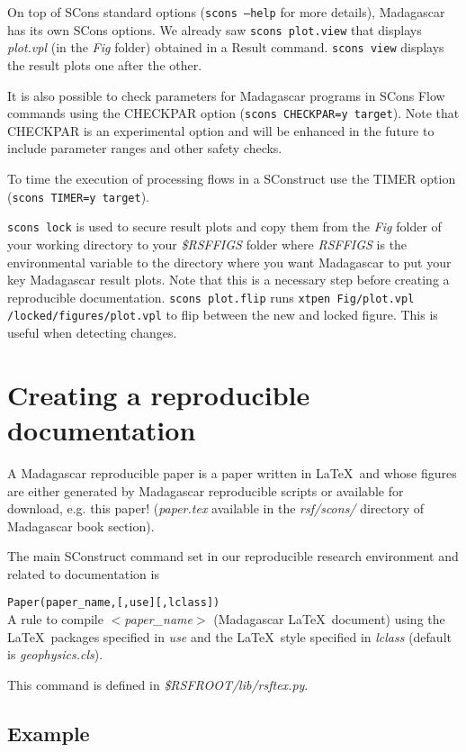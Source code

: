 On top of SCons standard options (\texttt{scons --help} for more
details), Madagascar has its own SCons options. We already saw
\texttt{scons plot.view} that displays \textit{plot.vpl} (in the
\textit{Fig} folder) obtained in a Result command. \texttt{scons view}
displays the result plots one after the other.

It is also possible to check parameters for Madagascar programs in
SCons Flow commands using the CHECKPAR option (\texttt{scons
  CHECKPAR=y target}). Note that CHECKPAR is an experimental option
and will be enhanced in the future to include parameter ranges and
other safety checks.

To time the execution of processing flows in a SConstruct use the
TIMER option (\texttt{scons TIMER=y target}).

\texttt{scons lock} is used to secure result plots and copy them from
the \textit{Fig} folder of your working directory to your
\textit{\$RSFFIGS} folder where \textit{RSFFIGS} is the environmental
variable to the directory where you want Madagascar to put your key
Madagascar result plots. Note that this is a necessary step before
creating a reproducible documentation. \texttt{scons plot.flip} runs
\texttt{xtpen Fig/plot.vpl /locked/figures/plot.vpl} to flip between
the new and locked figure. This is useful when detecting changes.

\section{Creating a reproducible documentation}
%
A Madagascar reproducible paper is a paper written in \LaTeX\ and
whose figures are either generated by Madagascar reproducible scripts
or available for download, e.g.  this paper!  (\textit{paper.tex}
available in the \textit{rsf/scons/} directory of Madagascar book
section).

The main SConstruct command set in our reproducible research
environment and related to documentation is

\noindent\texttt{Paper(paper\_name,[,use][,lclass])}\\
\indent A rule to compile \textit{$<$paper\_name$>$} (Madagascar
\LaTeX\ document) using the \LaTeX\ packages specified in \textit{use}
and the \LaTeX\ style specified in \textit{lclass} (default is
\textit{geophysics.cls}).

This command is defined in \textit{\$RSFROOT/lib/rsftex.py}.

\subsection{Example}

